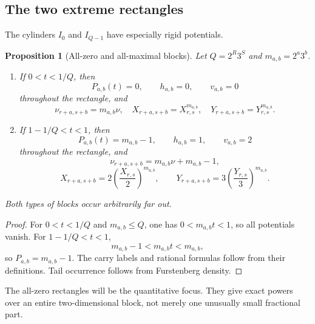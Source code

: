 \documentclass[11pt]{article}
\newtheorem{proposition}[theorem]{Proposition}
\theoremstyle{definition}
\theoremstyle{remark}
\begin{document}
\subsection{The two extreme rectangles}

The cylinders $I_0$ and $I_{Q-1}$ have especially rigid potentials.

\begin{proposition}[All-zero and all-maximal blocks]\label{prop:extreme-blocks}
Let $Q=2^R3^S$ and $m_{a,b}=2^a3^b$.

\begin{enumerate}
\item If $0<t<1/Q$, then
\begin{equation}\label{eq:zero-potential}
 P_{a,b}(t)=0,
 \qquad h_{a,b}=0,
 \qquad v_{a,b}=0
\end{equation}
throughout the rectangle, and
\begin{equation}\label{eq:zero-block-scaling}
 \nu_{r+a,s+b}=m_{a,b}\nu,
 \quad
 X_{r+a,s+b}=X_{r,s}^{m_{a,b}},
 \quad
 Y_{r+a,s+b}=Y_{r,s}^{m_{a,b}}.
\end{equation}

\item If $1-1/Q<t<1$, then
\begin{equation}\label{eq:max-potential}
 P_{a,b}(t)=m_{a,b}-1,
 \qquad h_{a,b}=1,
 \qquad v_{a,b}=2
\end{equation}
throughout the rectangle, and
\begin{equation}\label{eq:max-block-scaling}
 \nu_{r+a,s+b}=m_{a,b}\nu+m_{a,b}-1,
\end{equation}
\begin{equation}\label{eq:max-block-rationals}
 X_{r+a,s+b}=2\left(\frac{X_{r,s}}{2}\right)^{m_{a,b}},
 \qquad
 Y_{r+a,s+b}=3\left(\frac{Y_{r,s}}{3}\right)^{m_{a,b}}.
\end{equation}
\end{enumerate}
Both types of blocks occur arbitrarily far out.
\end{proposition}

\begin{proof}
For $0<t<1/Q$ and $m_{a,b}\le Q$, one has $0<m_{a,b}t<1$, so all potentials vanish.
For $1-1/Q<t<1$,
\[
 m_{a,b}-1<m_{a,b}t<m_{a,b},
\]
so $P_{a,b}=m_{a,b}-1$.  The carry labels and rational formulas follow from their
definitions.  Tail occurrence follows from Furstenberg density.
\end{proof}

The all-zero rectangles will be the quantitative focus.  They give exact powers over
an entire two-dimensional block, not merely one unusually small fractional part.
\end{document}
